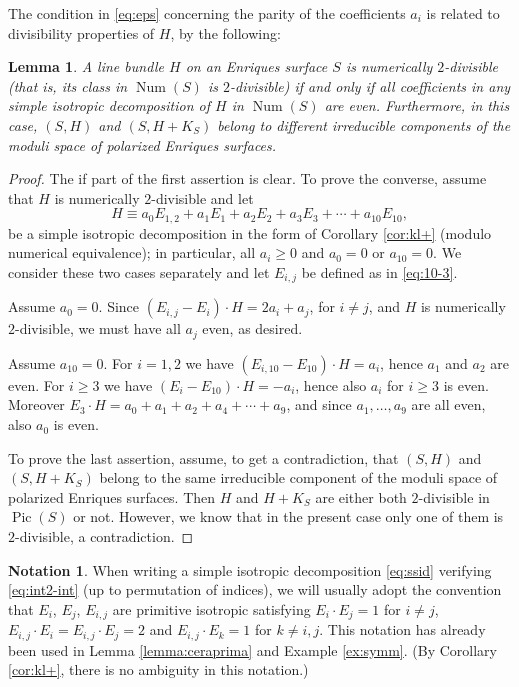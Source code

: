 \documentclass[11pt]{amsart}
\newtheorem{lemma}[thm]{Lemma}
\theoremstyle{definition}
\newtheorem{notation}[thm]{Notation}
\def\Pic{\operatorname{Pic}}
\def\Num{\operatorname{Num}}
\renewcommand{\geq}{\geqslant}
\begin{document}
 The condition in \eqref{eq:eps} concerning the parity of the coefficients $a_i$ is related to divisibility properties of $H$, by the following:








\begin{lemma} \label{lemma:H2div}
  A line bundle $H$ on an Enriques surface  $S$  is numerically $2$-divisible  (that is, its class in $\Num(S)$ is $2$-divisible)  if and only if  all coefficients in any simple isotropic decomposition of $H$ in $\Num(S)$ are even. Furthermore, in this case, 
$(S,H)$ and $(S,H+K_S)$ belong to different irreducible components of the moduli space of polarized Enriques surfaces. 
\end{lemma}

\begin{proof}
  The if part  of the first assertion  is clear. To prove the converse,
assume that $H$ is numerically $2$-divisible and  let  
\[  H \equiv a_0E_{1,2}+a_1E_1+a_2E_2+a_3E_3+\cdots+a_{10}E_{10},\]
 be a simple isotropic decomposition in the form of  Corollary \ref{cor:kl+}  (modulo numerical equivalence); in particular, all $a_i \geq 0$  and $a_0=0$ or $a_{10}=0$. We consider these two cases separately and  let $E_{i,j}$ be defined as in 
\eqref{eq:10-3}.

Assume $a_0=0$. Since $(E_{i,j}-E_i) \cdot H=2a_i+a_j$, for $i \neq j$, and $H$ is numerically $2$-divisible, we must have all $a_j$ even, as desired. 

Assume $a_{10}=0$. For $i=1,2$ we have $(E_{i,10}-E_{10}) \cdot H=a_i$, hence $a_1$ and $a_2$ are even. For $i \geqslant 3$ we have $(E_i-E_{10}) \cdot H = -a_i$, hence also $a_i$ for $i \geqslant 3$ is even. Moreover $E_3\cdot H=a_0+a_1+a_2+a_4  +\cdots +a_{9}$,  and since $a_1,\ldots, a_{9}$  are all even, also $a_0$ is even.

 To prove the last assertion, assume, to get a contradiction, that
$(S,H)$ and $(S,H+K_S)$ belong to the same irreducible component of the moduli space of polarized Enriques surfaces. Then $H$ and $H+K_S$ are either both $2$-divisible in $\Pic(S)$ or not. However, we know that in the present case  only one of them is $2$-divisible, a contradiction.
\end{proof}



\begin{notation} \label{not:int}
  When writing a simple isotropic decomposition \eqref {eq:ssid} verifying \eqref {eq:int2-int} (up to  permutation of indices), we will usually adopt the convention that $E_i$, $E_j$, $E_{i,j}$ are primitive isotropic satisfying
$E_i \cdot E_j=1$ for $i \neq j$, $E_{i,j} \cdot E_i= E_{i,j} \cdot E_j=2$ and
$E_{i,j} \cdot E_k=1$ for $k \neq i,j$. This notation has already been used in Lemma \ref{lemma:ceraprima}  and Example \ref{ex:symm}.   (By Corollary \ref{cor:kl+}, there  is no ambiguity in this notation.) 
\end{notation}
\end{document}
